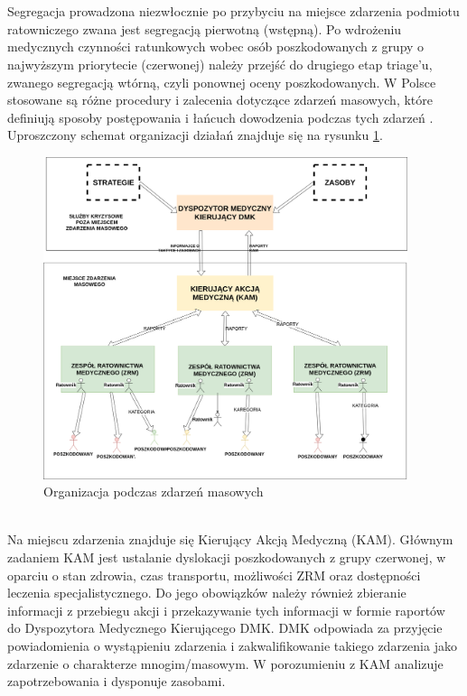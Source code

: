 \documentclass[11pt]{report}
\begin{document}
\\\\
Segregacja prowadzona niezwłocznie po przybyciu na miejsce zdarzenia podmiotu ratowniczego zwana jest segregacją pierwotną (wstępną). Po wdrożeniu medycznych czynności ratunkowych wobec osób poszkodowanych z grupy o najwyższym priorytecie (czerwonej) należy przejść do drugiego etap triage’u, zwanego segregacją wtórną, czyli ponownej oceny poszkodowanych.
\newpage
\noindent
W Polsce stosowane są różne procedury i zalecenia dotyczące zdarzeń masowych, które definiują sposoby postępowania i łańcuch dowodzenia podczas tych zdarzeń \cite{procedury}. Uproszczony schemat organizacji działań znajduje się na rysunku \ref{fig:org}.
\begin{figure}[h!]
  \centering
    \includegraphics[width=0.95\textwidth]{img/hierarchy.png}
  \caption{Organizacja podczas zdarzeń masowych}
  \label{fig:org}
\end{figure}
\\
Na miejscu zdarzenia znajduje się Kierujący Akcją Medyczną (KAM). Głównym zadaniem KAM jest ustalanie dyslokacji poszkodowanych z grupy czerwonej, w oparciu o stan zdrowia, czas transportu, możliwości ZRM oraz dostępności leczenia specjalistycznego. Do jego obowiązków należy również zbieranie informacji z przebiegu akcji i przekazywanie tych informacji w formie raportów do Dyspozytora Medycznego Kierującego DMK. DMK odpowiada za przyjęcie powiadomienia o wystąpieniu zdarzenia i zakwalifikowanie takiego zdarzenia jako zdarzenie o charakterze mnogim/masowym. W porozumieniu z KAM analizuje zapotrzebowania i dysponuje zasobami.
\newpage
\end{document}
